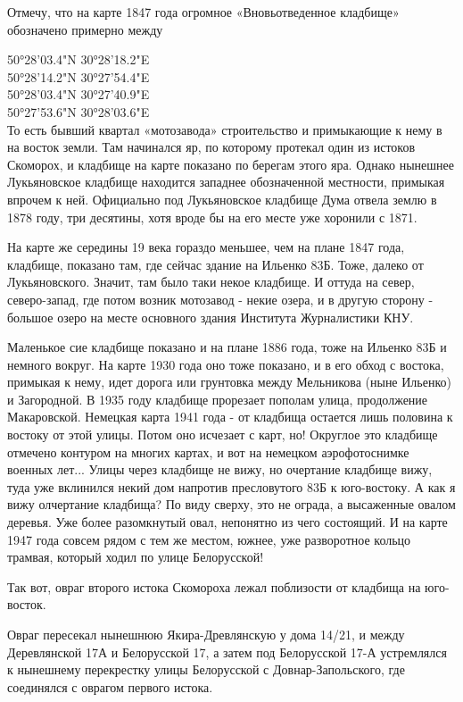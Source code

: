 Отмечу, что на карте 1847 года огромное «Вновьотведенное кладбище» обозначено примерно между 

50°28'03.4"N 30°28'18.2"E\\
50°28'14.2"N 30°27'54.4"E\\
50°28'03.4"N 30°27'40.9"E\\
50°27'53.6"N 30°28'03.6"E\\

То есть бывший квартал «мотозавода» строительство и примыкающие к нему в на восток земли. Там начинался яр, по которому протекал один из истоков Скоморох, и кладбище на карте показано по берегам этого яра. Однако нынешнее Лукьяновское кладбище находится западнее обозначенной местности, примыкая впрочем к ней. Официально под Лукьяновское кладбище Дума отвела землю в 1878 году, три десятины, хотя вроде бы на его месте уже хоронили с 1871. 

На карте же середины 19 века гораздо меньшее, чем на плане 1847 года, кладбище, показано там, где сейчас здание на Ильенко 83Б. Тоже, далеко от Лукьяновского. Значит, там было таки некое кладбище. И оттуда на север, северо-запад, где потом возник мотозавод - некие озера, и в другую сторону - большое озеро на месте основного здания Института Журналистики КНУ.

Маленькое сие кладбище показано и на плане 1886 года, тоже на Ильенко 83Б и немного вокруг. На карте 1930 года оно тоже показано, и в его обход с востока, примыкая к нему, идет дорога или грунтовка между Мельникова (ныне Ильенко) и Загородной. В 1935 году кладбище прорезает пополам улица, продолжение Макаровской. Немецкая карта 1941 года - от кладбища остается лишь половина к востоку от этой улицы. Потом оно исчезает с карт, но! Округлое это кладбище отмечено контуром на многих картах, и вот на немецком аэрофотоснимке военных лет... Улицы через кладбище не вижу, но очертание кладбище вижу, туда уже вклинился некий дом напротив пресловутого 83Б к юго-востоку. А как я вижу олчертание кладбища? По виду сверху, это не ограда, а высаженные овалом деревья. Уже более  разомкнутый овал, непонятно из чего состоящий. И на карте 1947 года совсем рядом с тем же местом, южнее, уже разворотное кольцо трамвая, который ходил по улице Белорусской!

Так вот, овраг второго истока Скомороха лежал поблизости от кладбища на юго-восток.

Овраг пересекал нынешнюю Якира-Древлянскую у дома 14/21, и между Деревлянской 17А и Белорусской 17, а затем под Белорусской 17-А устремлялся к нынешнему перекрестку улицы Белорусской с Довнар-Запольского, где соединялся с оврагом первого истока.

